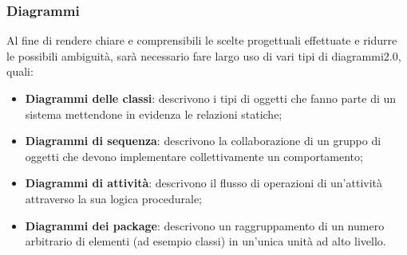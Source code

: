 \subsubsection{Diagrammi}
Al fine di rendere chiare e comprensibili le scelte progettuali effettuate e ridurre le possibili ambiguità, sarà necessario fare largo uso di vari tipi di diagrammi2.0, quali:
\begin{itemize}
	\item \textbf{Diagrammi delle classi}: descrivono i tipi di oggetti che fanno parte di un sistema mettendone in evidenza le relazioni statiche;
	\item \textbf{Diagrammi di sequenza}: descrivono la collaborazione di un gruppo di oggetti che devono implementare collettivamente un comportamento;
	\item \textbf{Diagrammi di attività}: descrivono il flusso di operazioni di un'attività attraverso la sua logica procedurale;
	\item \textbf{Diagrammi dei package}: descrivono un raggruppamento di un numero arbitrario di elementi (ad esempio classi) in un'unica unità ad alto livello.
	
\end{itemize}


